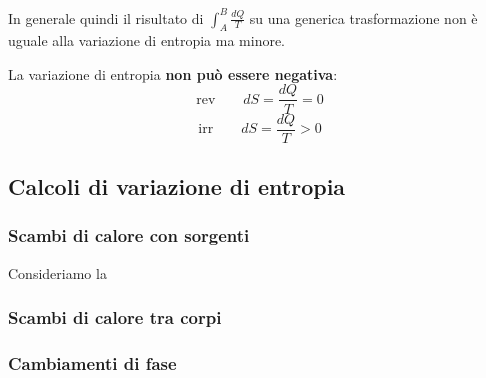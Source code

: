 \documentclass[x11names]{report}
\begin{document}
In generale quindi il risultato di \(\int_{A}^{B}\frac{dQ}{T}\) su una generica trasformazione non è uguale alla variazione di entropia ma minore.

La variazione di entropia \textbf{non può essere negativa}:
\[ 
\text{rev} \qquad dS = \frac{dQ}{T} = 0
\]
\[ 
\text{irr} \qquad dS = \frac{dQ}{T} > 0
\]
\subsection{Calcoli di variazione di entropia}
\subsubsection{Scambi di calore con sorgenti}
Consideriamo la 
\subsubsection{Scambi di calore tra corpi}
\subsubsection{Cambiamenti di fase}
\end{document}
